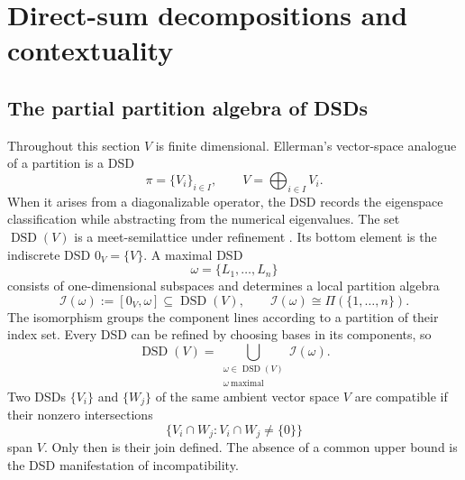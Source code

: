 \documentclass[aps,pra,reprint,nofootinbib]{revtex4-2}
\newcommand{\Part}{\Pi}
\newcommand{\DSD}{\operatorname{DSD}}
\begin{document}
\section{Direct-sum decompositions and contextuality}

\subsection{The partial partition algebra of DSDs}

Throughout this section $V$ is finite dimensional.  Ellerman's vector-space
analogue of a partition is a DSD
\begin{equation}
  \pi=\{V_i\}_{i\in I},\qquad V=\bigoplus_{i\in I}V_i.
\end{equation}
When it arises from a diagonalizable operator, the DSD records the eigenspace
classification while abstracting from the numerical eigenvalues.
The set $\DSD(V)$ is a meet-semilattice under refinement
\cite{ellerman-2018-dsd-quantum-logic}.  Its bottom element is the indiscrete
DSD $0_V=\{V\}$.  A maximal DSD
\begin{equation}
  \omega=\{L_1,\ldots,L_n\}
\end{equation}
consists of one-dimensional subspaces and determines a local partition
algebra
\begin{equation}
  \mathcal I(\omega):=[0_V,\omega]\subseteq\DSD(V),
  \qquad
  \mathcal I(\omega)\cong\Part(\{1,\ldots,n\}).
  \label{eq:local-partition-algebra}
\end{equation}
The isomorphism groups the component lines according to a partition of their
index set.  Every DSD can be refined by choosing bases in its components, so
\begin{equation}
  \DSD(V)=
  \bigcup_{\substack{\omega\in\DSD(V)\\ \omega\ \mathrm{maximal}}}
  \mathcal I(\omega).
  \label{eq:dsd-interval-cover}
\end{equation}
Two DSDs $\{V_i\}$ and $\{W_j\}$ of the same ambient vector space $V$ are
compatible if their nonzero intersections
\begin{equation}
  \{V_i\cap W_j:V_i\cap W_j\ne\{0\}\}
  \label{eq:dsd-protojoin}
\end{equation}
span $V$.  Only then is their join defined.  The absence of a common upper
bound is the DSD manifestation of incompatibility.
\end{document}
